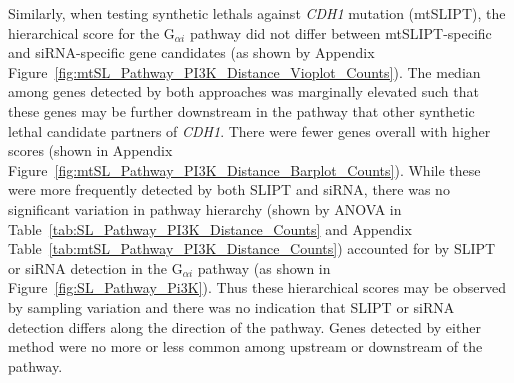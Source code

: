 Similarly, when testing \glspl{synthetic lethal} against \textit{CDH1} \gls{mutation} (\acrshort{mtSLIPT}), the hierarchical score for the G$_{\alpha i}$ \gls{pathway} did not differ between \acrshort{mtSLIPT}-specific and \gls{siRNA}-specific gene candidates (as shown by Appendix Figure~\ref{fig:mtSL_Pathway_PI3K_Distance_Vioplot_Counts}). The median among genes detected by both approaches was marginally elevated such that these genes may be further downstream in the \gls{pathway} that other \gls{synthetic lethal} candidate partners of \textit{CDH1}. There were fewer genes overall with higher scores (shown in Appendix Figure~\ref{fig:mtSL_Pathway_PI3K_Distance_Barplot_Counts}). While these were more frequently detected by both \gls{SLIPT} and \gls{siRNA}, there was no significant variation in \gls{pathway} hierarchy (shown by \gls{ANOVA} in Table~\ref{tab:SL_Pathway_PI3K_Distance_Counts} and Appendix Table~\ref{tab:mtSL_Pathway_PI3K_Distance_Counts}) accounted for by \gls{SLIPT} or \gls{siRNA} detection in the G$_{\alpha i}$ \gls{pathway} (as shown in Figure~\ref{fig:SL_Pathway_Pi3K}). Thus these hierarchical scores may be observed by sampling variation and there was no indication that \gls{SLIPT} or \gls{siRNA} detection differs along the direction of the \gls{pathway}. Genes detected by either method were no more or less common among upstream or downstream of the \gls{pathway}.




\begin{table*}[!h]
\caption{\acrshort{ANOVA} for synthetic lethality and PI3K hierarchy}
\label{tab:SL_Pathway_PI3K_Distance_Counts}
\noindent{}
\end{table*}

